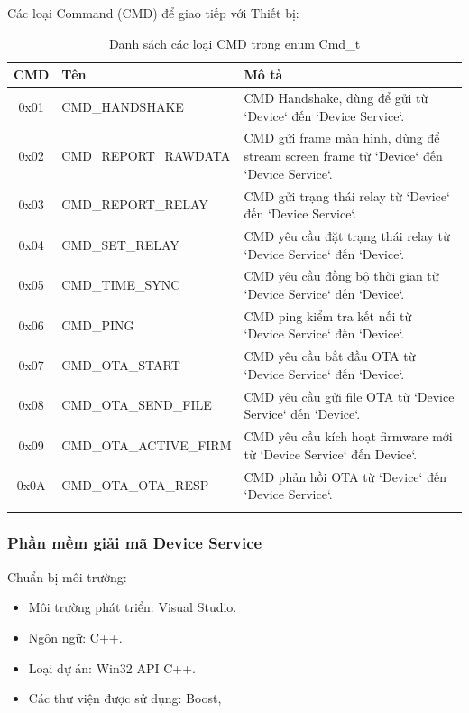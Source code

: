 Các loại Command (CMD) để giao tiếp với Thiết bị:

\begin{longtable}{|c|l|p{6cm}|}
\hline
\textbf{CMD} & \textbf{Tên} & \textbf{Mô tả} \\
\hline
\endfirsthead



0x01 & CMD\_HANDSHAKE & CMD Handshake, dùng để gửi từ `Device` đến `Device Service`. \\
\hline
0x02 & CMD\_REPORT\_RAWDATA & CMD gửi frame màn hình, dùng để stream screen frame từ `Device` đến `Device Service`. \\
\hline
0x03 & CMD\_REPORT\_RELAY & CMD gửi trạng thái relay từ `Device` đến `Device Service`. \\
\hline
0x04 & CMD\_SET\_RELAY & CMD yêu cầu đặt trạng thái relay từ `Device Service` đến `Device`. \\
\hline
0x05 & CMD\_TIME\_SYNC & CMD yêu cầu đồng bộ thời gian từ `Device Service` đến `Device`. \\
\hline
0x06 & CMD\_PING & CMD ping kiểm tra kết nối từ `Device Service` đến `Device`. \\
\hline
0x07 & CMD\_OTA\_START & CMD yêu cầu bắt đầu OTA từ `Device Service` đến `Device`. \\
\hline
0x08 & CMD\_OTA\_SEND\_FILE & CMD yêu cầu gửi file OTA từ `Device Service` đến `Device`. \\
\hline
0x09 & CMD\_OTA\_ACTIVE\_FIRM & CMD yêu cầu kích hoạt firmware mới từ `Device Service` đến Device`. \\
\hline
0x0A & CMD\_OTA\_OTA\_RESP & CMD phản hồi OTA từ `Device` đến `Device Service`. \\
\hline

\caption{Danh sách các loại CMD trong enum Cmd\_t}
\label{tab:cmd_list}
\end{longtable}



\subsubsection{Phần mềm giải mã Device Service}

Chuẩn bị môi trường:

\begin{itemize}
    \item Môi trường phát triển: Visual Studio.
    \item Ngôn ngữ: C++.
    \item Loại dự án: Win32 API C++.
    \item Các thư viện được sử dụng: Boost, 
\end{itemize}


